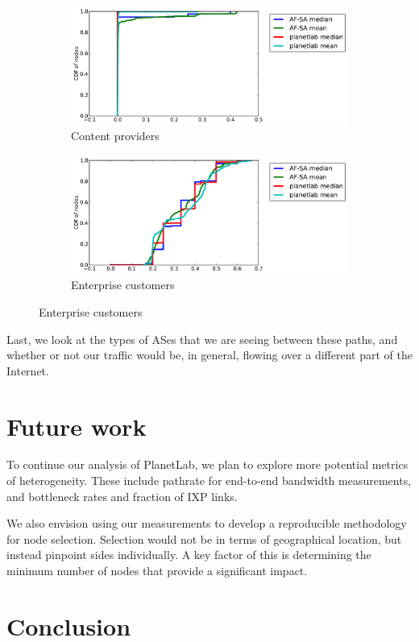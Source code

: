 \documentclass{sig-alternate-10pt}
\begin{document}
\begin{figure}
\begin{subfigure}[b]{0.45\textwidth}
\centering
    \includegraphics[width=1.0\linewidth]{figs/fractions_of_types-cp.pdf}
    \caption{Content providers}
\end{subfigure}
\begin{subfigure}[b]{0.45\textwidth}
\centering
    \includegraphics[width=1.0\linewidth]{figs/fractions_of_types-ec.pdf}
    \caption{Enterprise customers}
\end{subfigure}
\end{figure}

Last, we look at the types of ASes that we are seeing between these paths, and
whether or not our traffic would be, in general, flowing over a different part
of the Internet.


\section{Future work}

To continue our analysis of PlanetLab, we plan to explore more potential metrics
of heterogeneity. These include pathrate for end-to-end bandwidth measurements,
and bottleneck rates and fraction of IXP links. 

We also envision using our measurements to develop a reproducible methodology for
node selection. Selection would not be in terms of geographical location, but 
instead pinpoint sides individually. A key factor of this is determining the 
minimum number of nodes that  provide a significant impact.

\section{Conclusion}




\end{document}
